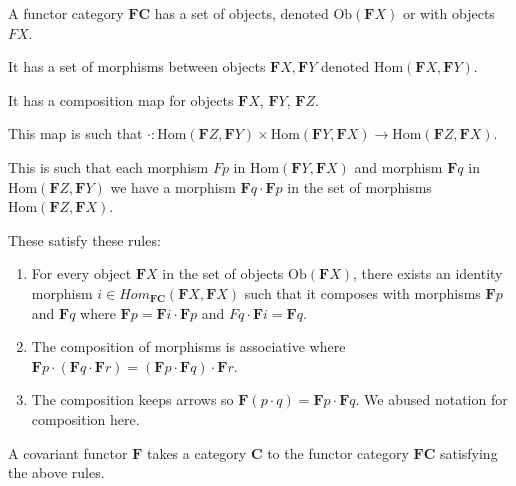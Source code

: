 \begin{definition}
	\label{definition-covariant-functor}
	A functor category $\mathbf{FC}$ has a set of objects, denoted $\mathrm{Ob}(\mathbf{F}X)$ or with objects $FX$.
	
	It has a set of morphisms between objects $\mathbf{F}X, \mathbf{F}Y$ denoted $\mathrm{Hom}(\mathbf{F}X,\mathbf{F}Y)$. 
	
	It has a composition map for objects $\mathbf{F}X$, $\mathbf{F}Y$, $\mathbf{F}Z$.
	
	This map is such that $\cdot: \mathrm{Hom}(\mathbf{F}Z, \mathbf{F}Y) \times \mathrm{Hom}(\mathbf{F}Y,\mathbf{F}X) \rightarrow \mathrm{Hom}(\mathbf{F}Z, \mathbf{F}X)$.
	
	This is such that each morphism $Fp$ in $\mathrm{Hom}(\mathbf{F}Y,\mathbf{F}X)$ and morphism $\mathbf{F}q$ in $\mathrm{Hom}(\mathbf{F}Z, \mathbf{F}Y)$ we have a morphism $\mathbf{F}q \cdot \mathbf{F}p$ in the set of morphisms $\mathrm{Hom}(\mathbf{F}Z, \mathbf{F}X)$.

	These satisfy these rules:

	\begin{enumerate}
		\item For every object $\mathbf{F}X$ in the set of objects $\mathrm{Ob}(\mathbf{F}X)$, there exists an identity morphism $i \in Hom_\mathbf{FC}(\mathbf{F}X, \mathbf{F}X)$ such that it composes with morphisms $\mathbf{F}p$ and $\mathbf{F}q$ where $\mathbf{F}p = \mathbf{F}i \cdot \mathbf{F}p$ and $Fq \cdot \mathbf{F}i = \mathbf{F}q$.
		\item The composition of morphisms is associative where $\mathbf{F}p \cdot ( \mathbf{F}q \cdot \mathbf{F}r) = (\mathbf{F}p \cdot \mathbf{F}q) \cdot \mathbf{F}r$.
		\item The composition keeps arrows so $\mathbf{F}(p \cdot q) = \mathbf{F}p \cdot \mathbf{F}q$. We abused notation for composition here.
	\end{enumerate}

	A covariant functor $\mathbf{F}$ takes a category $\mathbf{C}$ to the functor category $\mathbf{FC}$ satisfying the above rules.
\end{definition}

